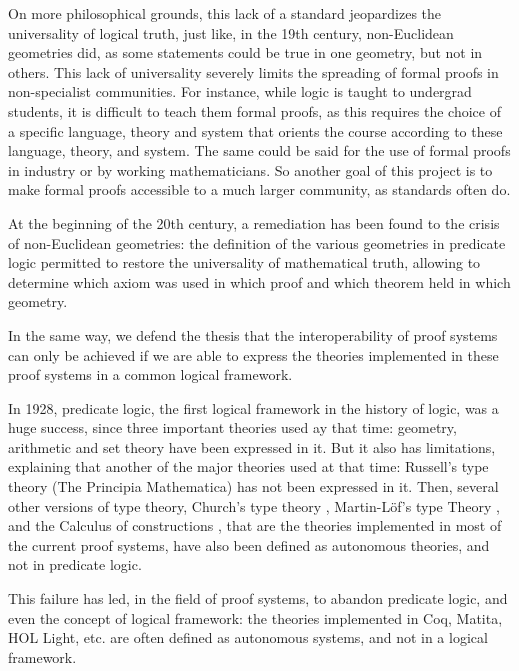 On more philosophical grounds, this lack of a standard jeopardizes the
universality of logical truth, just like, in the 19th century,
non-Euclidean geometries did, as some statements could be true in one
geometry, but not in others.  This lack of universality severely
limits the spreading of formal proofs in non-specialist
communities. For instance, while logic is taught to undergrad
students, it is difficult to teach them formal proofs, as this
requires the choice of a specific language, theory and system that
orients the course according to these language, theory, and
system. The same could be said for the use of formal proofs in
industry or by working mathematicians. So another goal of this project
is to make formal proofs accessible to a much larger community, as
standards often do.

At the beginning of the 20th century, a remediation has been found to
the crisis of non-Euclidean geometries: the definition of the various
geometries in predicate logic \cite{HilbertAckermann} permitted to
restore the universality of mathematical truth, allowing to determine
which axiom was used in which proof and which theorem held in
which geometry.

In the same way, we defend the thesis that the interoperability of
proof systems can only be achieved if we are able to express the theories
implemented in these proof systems in a common logical framework.

In 1928, predicate logic, the first logical framework in the history
of logic, was a huge success, since three important theories used ay
that time: geometry, arithmetic and set theory have been expressed in
it. But it also has limitations, explaining that another of the major
theories used at that time: Russell's type theory (The Principia
Mathematica) has not been expressed in it.  Then, several other
versions of type theory, Church's type theory \cite{Church40},
Martin-L\"of's type Theory \cite{Martin-Lof84}, and the Calculus of
constructions \cite{CoquandHuet88}, that are the theories implemented
in most of the current proof systems, have also been defined as
autonomous theories, and not in predicate logic.

This failure has led, in the field of proof systems, to abandon
predicate logic, and even the concept of logical framework: the
theories implemented in {\sc Coq}, {\sc Matita}, {\sc HOL Light},
etc. are often defined as autonomous systems, and not in a logical
framework.

